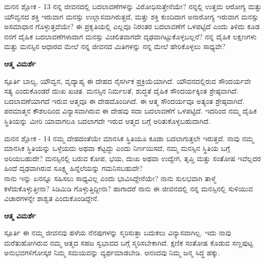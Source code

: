 \begin{mananam}{\kanfont ಮನನ ಶ್ಲೋಕ - \textenglish{13}}
\footnotesize \mananamfont ನನ್ನ ಜೀವನದಲ್ಲಿ ಬದಲಾವಣೆಗಳನ್ನು ವಿರೋಧಿಸುತ್ತೇನೆಯೇ? ನನ್ನಲ್ಲಿ ಉತ್ತಮ ಆರೋಗ್ಯ ಮತ್ತು ಯೌವ್ವನದ ಶಕ್ತಿ ಇರುವಾಗ ಮನಸ್ಸು ಉಲ್ಲಾಸವಾಗಿರುತ್ತದೆ, ಮತ್ತು ಶಕ್ತಿ ಕುಂದಿದಾಗ ಅನಾರೋಗ್ಯ ಇರುವಾಗ ಮನಸ್ಸು ಅಸಮಾಧಾನ ಗೊಳ್ಳುತ್ತದೆಯೇ? ಈ ಪ್ರಕೃತಿಯಲ್ಲಿ ಎಲ್ಲವೂ ನಿರಂತರ ಬದಲಾವಣೆಗೆ ಒಳಪಟ್ಟಿದೆ ಎಂದು ತಿಳಿದು ಕೂಡ ನನಗೆ ದೈಹಿಕ ಬದಲಾವಣೆಗಳಾದಾಗ ಮನಸ್ಸು ವಿಚಲಿತವಾಗದೇ ದೃಢವಾಗಿಟ್ಟುಕೊಳ್ಳಬಲ್ಲನೆ? ನನ್ನ ದೈಹಿಕ ಲಕ್ಷಣಗಳು ಮತ್ತು ಮನಸ್ಸಿನ ಆಧಾರದ ಮೇಲೆ ನನ್ನ ಜೀವನದ ಮಿತಿಗಳನ್ನು ನನ್ನ ಮೇಲೆ ಹೇರಿಕೊಳ್ಳಲು ಸಾಧ್ಯವೇ?
\end{mananam}
\WritingHand\enspace\textbf{ಆತ್ಮ ವಿಮರ್ಶೆ}
\begin{inspiration}{\kanfont ಸ್ಪೂರ್ತಿ}
\footnotesize \mananamfont ಬಾಲ್ಯ, ಯೌವ್ವನ, ವೃದ್ಯಾಪ್ಯ ಈ ದೇಹದ ನೈಸರ್ಗಿಕ ಪ್ರಕ್ರಿಯೆಯಾಗಿದೆ. ಯೌವನದಲ್ಲಿರುವ ಸೌಂದರ್ಯವೇ ಸತ್ಯ ಎಂದುಕೊಂಡರೆ ದುಃಖ ಖಚಿತ. ಮನಸ್ಸಿನ ನಿರ್ಮಲತೆ, ಶುದ್ಧತೆ ದೈಹಿಕ ಸೌಂದರ್ಯಕ್ಕಿಂತ ಶ್ರೇಷ್ಠವಾಗಿದೆ. ಬದಲಾವಣೆಯಾಗದೆ ಇರುವ ಆತ್ಮವೂ ಈ ದೇಹದೊಂದಿಗಿದೆ. ಈ ಆತ್ಮ ಸೌಂದರ್ಯವೂ ಅತ್ಯಂತ ಶ್ರೇಷ್ಠವಾಗಿದೆ. ಪರಮಾತ್ಮನ ಕೌಶಲದಿಂದ ವಿನ್ಯಾಸವಾಗಿರುವ ಈ ದೇಹವು ಸದಾ ಬದಲಾವಣೆಗೆ ಒಳಪಟ್ಟಿದೆ. ಇದರಿಂದ ನಮ್ಮ ದೈಹಿಕ ಸ್ಥಿತಿಯನ್ನು ಮೀರಿ ಯಾವಾಗಲೂ ಬದಲಾಗದೇ ಇರುವ ಆತ್ಮದ ಬಗ್ಗೆ ಅರಿತುಕೊಳ್ಳಬಹುದಾಗಿದೆ.
\end{inspiration}
\newpage

\begin{mananam}{\kanfont ಮನನ ಶ್ಲೋಕ - \textenglish{14}}
\footnotesize \mananamfont ನಮ್ಮ ದೇಹದಂತೆಯೇ ಮಾನಸಿಕ ಸ್ಥಿತಿಯೂ ಕೂಡಾ ಬದಲಾಗುತ್ತಲೇ ಇರುತ್ತದೆ. ನಾವು ನಮ್ಮ ಮಾನಸಿಕ ಸ್ಥಿತಿಯನ್ನು ಒಳ್ಳೆಯದು ಅಥವಾ ಕೆಟ್ಟದ್ದು ಎಂದು ನಿರ್ಣಯಿಸದೆ, ನಮ್ಮ ಮನಸ್ಸಿನ ಸ್ಥಿತಿಯ ಬಗ್ಗೆ ಅರಿಯಬಹುದೇ? ಮನಸ್ಸಿನಲ್ಲಿ ಬರುವ ಕೋಪ, ಭಯ, ದುಃಖ ಅಥವಾ ಉದ್ವೇಗ, ತೃಪ್ತಿ ಮತ್ತು ಸಂತೋಷ ಇವೆಲ್ಲದರ ಹಿಂದೆ ದೃಢವಾಗಿರುವ ಸೂಕ್ಷ್ಮ ಹಿನ್ನೆಲೆಯನ್ನು  ಗಮನಿಸಬಹುದೇ?\\
ನಾನು ಇನ್ನು ಏನನ್ನೂ ಸಹಿಸಲು ಸಾಧ್ಯವಿಲ್ಲ ಎಂದು ಭಾವಿಸಿದ್ದೇನೆಯೇ? ನಾನು ಸುಲಭವಾಗಿ ತಾಳ್ಮೆ ಕಳೆದುಕೊಳ್ಳುತ್ತೀನಾ? ಸಿಡಿಮಿಡಿ ಗೊಳ್ಳುತ್ತಿದ್ದೀನಾ?  ಹಾಗಾದರೆ ನಾನು ಈ ಜೀವನದಲ್ಲಿ ನನ್ನ ಮನಸ್ಸಿನಲ್ಲಿ ಸುಳಿಯುವ ವಿಚಾರಗಳನ್ನೇ ಶಾಶ್ವತ ಎಂದುಕೊಂಡಿದ್ದೇನೆ.
\end{mananam}
\WritingHand\enspace\textbf{ಆತ್ಮ ವಿಮರ್ಶೆ}
\begin{inspiration}{\kanfont ಸ್ಪೂರ್ತಿ}
\footnotesize \mananamfont ಈ ನಮ್ಮ ಜೀವನವು ಹಳೆಯ ನೆನಪುಗಳನ್ನು ಸ್ಮರಿಸುತ್ತಾ ಬದುಕಲು ವಿನ್ಯಾಸವಾಗಿಲ್ಲ. ಇದು ನಾವು ಮರೆತುಹೋಗಿರುವ ನಮ್ಮ ಆತ್ಮದ ಸಹಜ ಸ್ವಭಾವದ ಬಗ್ಗೆ ಸ್ಮರಿಸಬೇಕಾಗಿದೆ. ಕ್ಷಣಿಕ ಸಂತೋಷ ಕೊಡುವ ಸಣ್ಣಪುಟ್ಟ ಅನುಭವಗಳಿಗೋಸ್ಕರ ನಿಮ್ಮ ಸಮಯವನ್ನು ವ್ಯರ್ಥಮಾಡಬೇಡಿ.  ಆನಂದವು ನಿಮ್ಮ ಜನ್ಮ ಸಿದ್ಧ ಹಕ್ಕು.
\end{inspiration}
\newpage

